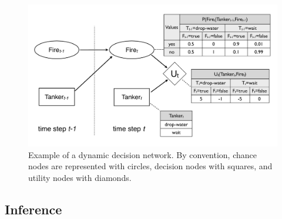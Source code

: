 \begin{figure}[h]
\centering
\includegraphics[scale=0.25]{imgs/ddn.pdf}
\caption{Example of a dynamic decision network. By convention, chance nodes are represented with circles, decision nodes with squares, and utility nodes with diamonds. }
\label{fig:ddn}
\end{figure}


\subsection{Inference} 
\label{sec:inference}

